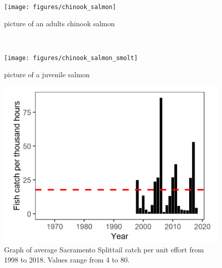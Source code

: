 \documentclass[
]{book}
\begin{document}
\begin{panel-grid}
\begin{columns-nocenter}
\begin{column40}
\end{column40}

\begin{column800}

\begin{figure}

{\centering \texttt{[image: figures/chinook\_salmon]} 

}

\caption{picture of an adults chinook salmon}\label{fig:unnamed-chunk-33}
\end{figure}

\end{column800}

\begin{column40}

~

\end{column40}

\begin{column800}

\begin{figure}

{\centering \texttt{[image: figures/chinook\_salmon\_smolt]} 

}

\caption{picture of a juvenile salmon}\label{fig:unnamed-chunk-34}
\end{figure}

\end{column800}

\end{columns-nocenter}

\begin{columns-nocenter}

\begin{column800}

\begin{expand}

\begin{figure}
\includegraphics[width=15.25in]{figures/yolo_splittail} \caption{Graph of average Sacramento Splittail catch per unit effort from 1998 to 2018. Values range from 4 to 80.}\label{fig:unnamed-chunk-35}
\end{figure}


\end{expand}
\end{column800}
\end{columns-nocenter}
\end{panel-grid}
\end{document}
